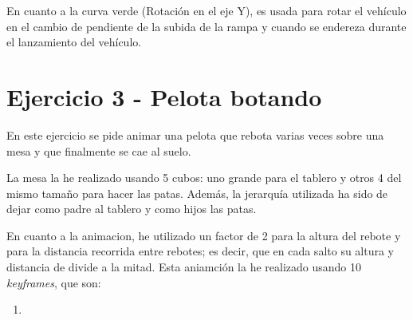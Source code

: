 \documentclass{article}
\begin{document}
En cuanto a la curva verde (Rotación en el eje Y), es usada para rotar el vehículo en el cambio de pendiente de la subida de la rampa y cuando se endereza durante el lanzamiento del vehículo.

\section{Ejercicio 3 - Pelota botando}

En este ejercicio se pide animar una pelota que rebota varias veces sobre una mesa y que finalmente se cae al suelo. 

La mesa la he realizado usando 5 cubos: uno grande para el tablero y otros 4 del mismo tamaño para hacer las patas. Además, la jerarquía utilizada ha sido de dejar como padre al tablero y como hijos las patas.

En cuanto a la animacion, he utilizado un factor de 2 para la altura del rebote y para la distancia recorrida entre rebotes; es decir, que en cada salto su altura y distancia de divide a la mitad. Esta aniamción la he realizado usando 10 \textit{keyframes}, que son:

\begin{enumerate}
    \item 
\end{enumerate}
\end{document}
